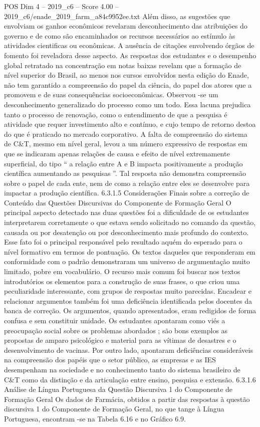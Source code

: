 \begin{textsample}{POS Dim 4 – 2019\_c6 – Score 4.00 – 2019\_c6/enade\_2019\_farm\_a84c9952ee.txt}
Além disso, as sugestões que envolviam os ganhos econômicos revelaram desconhecimento das atribuições do governo e de como são encaminhados os recursos necessários ao estímulo às atividades cientificas ou econômicas.
A ausência de citações envolvendo órgãos de fomento foi reveladora desse aspecto.
As respostas dos estudantes e o desempenho global retratado na concentração em notas baixas revelam que a formação de nível superior do Brasil, ao menos nos cursos envolvidos nesta edição do Enade, não tem garantido a compreensão do papel da ciência, do papel dos atores que a promovem e de suas consequências socioeconômicas.
Observou -se um desconhecimento generalizado do processo como um todo.
Essa lacuna prejudica tanto o processo de renovação, como o entendimento de que a pesquisa é atividade que requer investimento alto e contínuo, e cujo tempo de retorno destoa do que é praticado no mercado corporativo.
A falta de compreensão do sistema de C\&T, mesmo em nível geral, levou a um número expressivo de respostas em que se indicaram apenas relações de causa e efeito de nível extremamente superficial, do tipo “ a relação entre A e B impacta positivamente a produção científica aumentando as pesquisas ”.
Tal resposta não demonstra compreensão sobre o papel de cada ente, nem de como a relação entre eles se desenvolve para impactar a produção científica. 6.3.1.5 Considerações Finais sobre a correção de Conteúdo das Questões Discursivas do Componente de Formação Geral O principal aspecto detectado nas duas questões foi a dificuldade de os estudantes interpretarem corretamente o que estava sendo solicitado no comando da questão, causada ou por desatenção ou por desconhecimento mais profundo do contexto.
Esse fato foi o principal responsável pelo resultado aquém do esperado para o nível formativo em termos de pontuação.
Os textos daqueles que responderam em conformidade com o padrão demonstraram um universo de argumentação muito limitado, pobre em vocabulário.
O recurso mais comum foi buscar nos textos introdutórios os elementos para a construção de suas frases, o que criou uma peculiaridade interessante, com grupos de respostas muito parecidas.
Encadear e relacionar argumentos também foi uma deficiência identificada pelos docentes da banca de correção.
Os argumentos, quando apresentados, eram redigidos de forma confusa e sem constituir unidade.
Os estudantes apontaram como viés a preocupação social sobre os problemas abordados ; são bons exemplos as propostas de amparo psicológico e material para as vítimas de desastres e o desenvolvimento de vacinas.
Por outro lado, apontaram deficiências consideráveis na compreensão dos papéis que o setor público, as empresas e as IES desempenham na sociedade e no conhecimento tanto do sistema brasileiro de C\&T como da distinção e da articulação entre ensino, pesquisa e extensão. 6.3.1.6 Análise de Língua Portuguesa da Questão Discursiva 1 do Componente de Formação Geral Os dados de Farmácia, obtidos a partir das respostas à questão discursiva 1 do Componente de Formação Geral, no que tange à Língua Portuguesa, encontram -se na Tabela 6.16 e no Gráfico 6.9.

\end{textsample}

